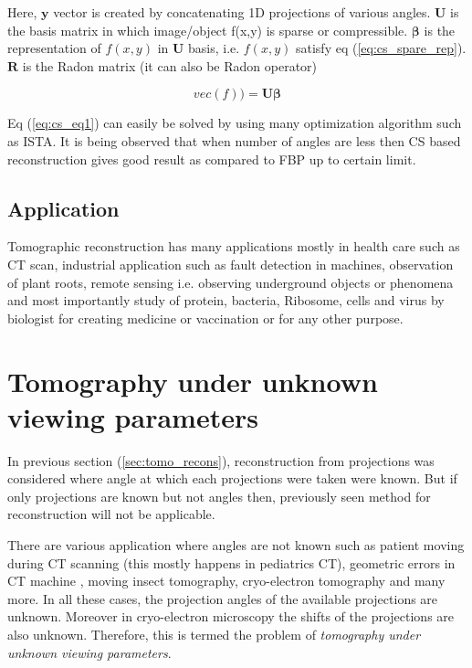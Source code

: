 \documentclass[twoside]{iitbreport}
\begin{document}
\noindent
Here, $\boldsymbol{y}$ vector is created by concatenating 1D projections of various angles. $\boldsymbol{U}$ is the basis matrix in which image/object f(x,y) is sparse or compressible. $\boldsymbol{\beta}$ is the representation of ${f(x,y)}$ in $\boldsymbol{U}$ basis, i.e. ${f(x,y)}$ satisfy eq (\ref{eq:cs_spare_rep}). $\boldsymbol{R}$ is the Radon matrix (it can also be  Radon operator)

\begin{equation}\label{eq:cs_spare_rep}
vec(f)) =  \boldsymbol{U\beta}
\end{equation}

\noindent
Eq (\ref{eq:cs_eq1}) can easily be solved by using many optimization algorithm such as ISTA.  It is being observed that when number of angles are less then CS based reconstruction gives good result as compared to FBP up to certain limit.

\subsection{Application}
Tomographic reconstruction has many applications mostly in health care such as CT scan, industrial application such as fault detection in machines, observation of plant roots, remote sensing i.e. observing underground objects or phenomena and most importantly study of protein, bacteria, Ribosome, cells and virus by biologist for creating medicine or vaccination or for any other purpose.

\section{Tomography under unknown viewing parameters }
In previous section (\ref{sec:tomo_recons}), reconstruction from projections was considered where angle at which each projections were taken were  known. But if only projections are known but not angles then, previously seen method for reconstruction will not be applicable. 

\noindent
There are various application where angles are not known such as patient moving during CT scanning (this mostly happens in pediatrics CT), geometric errors in CT machine \cite{malhotra2017signal}, moving insect tomography, cryo-electron tomography and many more. In all these cases, the projection angles of the available projections are unknown. Moreover in cryo-electron microscopy the shifts of the projections are also unknown. Therefore, this is termed the problem of \textit{tomography under unknown viewing parameters}.
\end{document}
